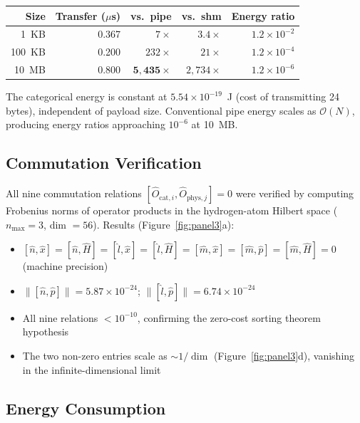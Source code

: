 \documentclass[12pt,twocolumn]{article}
\begin{document}
\begin{center}
\small
\begin{tabular}{rrrrr}
\toprule
Size & Transfer ($\mu$s) & vs.\ pipe & vs.\ shm & Energy ratio \\
\midrule
1~KB   & 0.367 & $7\times$      & $3.4\times$   & $1.2\times 10^{-2}$ \\
100~KB & 0.200 & $232\times$    & $21\times$    & $1.2\times 10^{-4}$ \\
10~MB  & 0.800 & $\mathbf{5{,}435}\times$ & $2{,}734\times$ & $1.2\times 10^{-6}$ \\
\bottomrule
\end{tabular}
\end{center}

The categorical energy is constant at $5.54 \times 10^{-19}$~J (cost of transmitting 24 bytes), independent of payload size. Conventional pipe energy scales as $\mathcal{O}(N)$, producing energy ratios approaching $10^{-6}$ at 10~MB.

\subsection{Commutation Verification}

All nine commutation relations $[\hat{O}_{\text{cat},i}, \hat{O}_{\text{phys},j}] = 0$ were verified by computing Frobenius norms of operator products in the hydrogen-atom Hilbert space ($n_{\max} = 3$, dim $= 56$). Results (Figure~\ref{fig:panel3}a):

\begin{itemize}
\item $[\hat{n}, \hat{x}] = [\hat{n}, \hat{H}] = [\hat{l}, \hat{x}] = [\hat{l}, \hat{H}] = [\hat{m}, \hat{x}] = [\hat{m}, \hat{p}] = [\hat{m}, \hat{H}] = 0$ (machine precision)
\item $\|[\hat{n}, \hat{p}]\| = 5.87 \times 10^{-24}$; $\|[\hat{l}, \hat{p}]\| = 6.74 \times 10^{-24}$
\item All nine relations $< 10^{-10}$, confirming the zero-cost sorting theorem hypothesis
\item The two non-zero entries scale as $\sim 1/\dim$ (Figure~\ref{fig:panel3}d), vanishing in the infinite-dimensional limit
\end{itemize}

\subsection{Energy Consumption}
\end{document}
